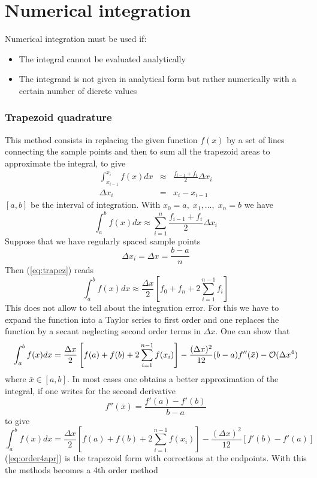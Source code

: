 \chapter{Numerical integration}
Numerical integration must be used if:
\begin{itemize}
	\item The integral cannot be evaluated analytically
	\item The integrand is not given in analytical form but rather
		numerically with a certain number of dicrete values
\end{itemize}
		
\subsection{Trapezoid quadrature}
This method consists in replacing the given function $f(x)$ by a set of lines connecting the sample points and then to sum all the trapezoid areas to approximate the integral, to give
\begin{eqnarray*}
	\int_{x_{i-1}}^{x_i}f(x)dx&\approx &\frac{f_{i-1}+f_i}{2}\Delta x_i\\
	\Delta x_i&=&x_i-x_{i-1}
\end{eqnarray*}
$[a,b]$ be the interval of integration. With $x_0=a,\; x_1,\dots,\; x_n=b$ we have
\begin{equation}
	\int_{a}^{b}f(x)dx\approx \sum_{i=1}^n\frac{f_{i-1}+f_i}{2}\Delta x_i
	\label{eq:trapez}
\end{equation}
Suppose that we have regularly spaced sample points
\[ \Delta x_i=\Delta x=\frac{b-a}{n} \]
Then (\ref{eq:trapez}) reads
\[\int_a^bf(x)dx\approx\frac{\Delta x}{2}\left[ f_0+f_n+2\sum_{i=1}^{n-1}f_i\right]\]
This does not allow to tell about the integration error. For this we have to
expand the function into a Taylor series to first order and one replaces the
function by a secant neglecting second order terms in $\Delta x$. One can show
that
\begin{equation}
	\int_a^bf(x)dx=\frac{\Delta x}{2}\left[ f(a)+f(b)+2\sum_{i=1}^{n-1}f(x_i)\right]
	-\frac{(\Delta x)^2}{12}(b-a)f''(\bar{x})-{\cal O}(\Delta x^4)
	\label{eq:order4}
\end{equation}
where $\bar{x}\in[a,b]$. In most cases one obtains a better approximation
of the integral, if one writes for the second derivative
\[ f''(\bar{x})=\frac{f'(a)-f'(b)}{b-a} \]
to give
\begin{equation}
        \int_a^bf(x)dx=\frac{\Delta x}{2}\left[ f(a)+f(b)+2\sum_{i=1}^{n-1}f(x_i)\right]
        -\frac{(\Delta x)^2}{12}\left[ f'(b)-f'(a)\right]
        \label{eq:order4apr}
\end{equation}
(\ref{eq:order4apr}) is the trapezoid form with corrections at the
endpoints. With this the methods becomes a 4th order method
